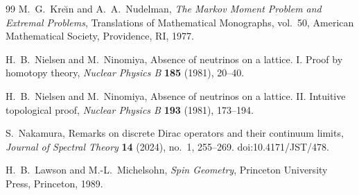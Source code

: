 \documentclass[11pt]{article}
\theoremstyle{definition}
\theoremstyle{remark}
\theoremstyle{definition}
\theoremstyle{remark}
\begin{document}
\begin{thebibliography}{99}
M.~G.~Kre\u{\i}n and A.~A.~Nudelman,
\newblock \emph{The Markov Moment Problem and Extremal Problems},
\newblock Translations of Mathematical Monographs, vol.~50,
American Mathematical Society, Providence, RI, 1977.

H.~B.~Nielsen and M.~Ninomiya,
\newblock Absence of neutrinos on a lattice. I. Proof by homotopy theory,
\newblock \emph{Nuclear Physics B} \textbf{185} (1981), 20--40.

H.~B.~Nielsen and M.~Ninomiya,
\newblock Absence of neutrinos on a lattice. II. Intuitive topological proof,
\newblock \emph{Nuclear Physics B} \textbf{193} (1981), 173--194.

S.~Nakamura,
\newblock Remarks on discrete Dirac operators and their continuum limits,
\newblock \emph{Journal of Spectral Theory} \textbf{14} (2024), no.~1,
255--269.
\newblock doi:10.4171/JST/478.

H.~B.~Lawson and M.-L.~Michelsohn,
\newblock \emph{Spin Geometry},
\newblock Princeton University Press, Princeton, 1989.

\end{thebibliography}
\end{document}
